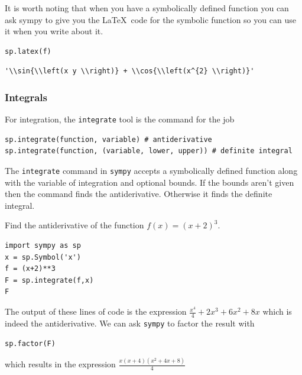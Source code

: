 \begin{example}
    It is worth noting that when you have a symbolically defined function you can ask
    sympy to give you the \LaTeX\ code for the symbolic function so you can use it when you write about it.

\bcode
\begin{lstlisting}
sp.latex(f)
\end{lstlisting}
\boutput
\begin{lstlisting}
'\\sin{\\left(x y \\right)} + \\cos{\\left(x^{2} \\right)}'
\end{lstlisting}
\end{example}

\subsubsection{Integrals}
For integration, the \texttt{integrate} tool is the command for the job
\begin{lstlisting}
sp.integrate(function, variable) # antiderivative
sp.integrate(function, (variable, lower, upper)) # definite integral
\end{lstlisting}
The
\texttt{integrate} command in \texttt{sympy} accepts a symbolically defined function along
with the variable of integration and optional bounds.  If the bounds aren't given then the
command finds the antiderivative.  Otherwise it finds the definite integral.

\begin{example}[An Antiderivative]
    Find the antiderivative of the function $f(x) = (x+2)^3$.

\bcode
\begin{lstlisting}
import sympy as sp 
x = sp.Symbol('x')
f = (x+2)**3
F = sp.integrate(f,x)
F
\end{lstlisting}
The output of these lines of code is the expression $\frac{x^{4}}{4} + 2 x^{3} + 6 x^{2}
+ 8 x$ which is indeed the antiderivative.  We can ask \texttt{sympy} to factor the result
with 

\bcode
\begin{lstlisting}
sp.factor(F)
\end{lstlisting}
which results in the expression $\displaystyle \frac{x \left(x + 4\right) \left(x^{2}
+ 4 x + 8\right)}{4}$
\end{example}

